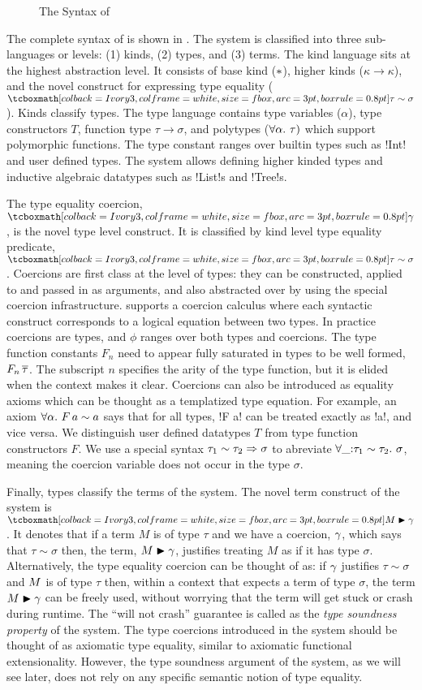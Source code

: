 \documentclass[screen,nonacm,manuscript,review]{acmart} %
\begin{document}
\begin{figure}[ht]
 \caption{The Syntax of \SFC}
 \label{fig:sfc-syntax}
\end{figure}

The complete syntax of \SFC is shown in . The
system is classified into three sub-languages or levels: (1) kinds,
(2) types, and (3) terms. The kind language sits at the highest
abstraction level. It consists of base kind ($\ast$), higher kinds
($\kappa \to \kappa$), and the novel construct for expressing type
equality ($\shl{\tau \sim \sigma}$).
Kinds classify types. The type language contains
type variables ($\alpha$), type constructors $T$,
function type $\tau\to\sigma$,
and polytypes ($\forall\alpha.~\tau)$ which support polymorphic functions.
The type constant ranges over builtin types such as !Int!
and user defined types.
The system allows defining higher kinded types and
inductive algebraic datatypes such as !List!s and !Tree!s.

The type equality coercion, $\shl{\Co}$, is the novel type level construct.
It is classified by kind level type equality predicate,
$\shl{\tau\sim\sigma}$. Coercions are first class at the level of types:
they can be constructed, applied to and passed in as arguments, and also
abstracted over by using the special coercion infrastructure.
\SFC supports a coercion calculus where
each syntactic construct corresponds to a logical equation between two
types. In practice coercions are types, and $\phi$ ranges over both
types and coercions. The type function constants $F_n$ need to appear fully
saturated in types to be well formed, $F_n\,\overline{\tau}$.
The subscript $n$ specifies the arity of the type function,
but it is elided when the context makes it clear.
Coercions can also be introduced as equality axioms which can be
thought as a templatized type equation.
For example, an axiom $\forall\alpha.~F\, a \sim a$
says that for all types, !F a! can be treated exactly as !a!, and vice
versa. We distinguish user defined datatypes $T$
from type function constructors $F$. We use a special syntax $\tau_1 \sim \tau_2 \Rightarrow \sigma$
to abreviate $\forall\_ {:} \tau_1 \sim \tau_2.~\sigma$, meaning the coercion
variable does not occur in the type $\sigma$.


Finally, types classify the terms of the system.
The novel term construct of the system is $\shl{\Cast \Tm \Co}$.
It denotes that if a term $M$ is of type $\tau$
and we have a coercion, $\gamma$, which says that $\tau\sim\sigma$
then, the term, $M\mathrel{\blacktriangleright}\gamma$, justifies treating $M$ as if it has type
$\sigma$. Alternatively, the type equality coercion can be thought of
as: if $\gamma$ justifies $\tau \sim \sigma$ and $M$ is of type $\tau$
then, within a context that expects a term of type $\sigma$,
the term $M\mathrel{\blacktriangleright}\gamma$ can be freely used,
without worrying that the term will get stuck or crash during runtime.
The ``will not crash'' guarantee is called as the \emph{type
  soundness property} of the system. The type coercions introduced
in the system should be thought of as axiomatic type equality,
similar to axiomatic functional extensionality.
However, the type soundness argument of the system, as we
will see later, does not rely on any specific
semantic notion of type equality.
\end{document}

